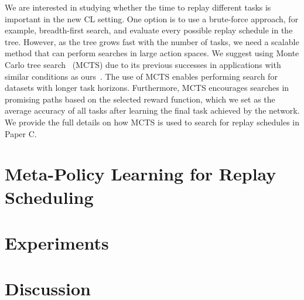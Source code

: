 We are interested in studying whether the time to replay different tasks is important in the new CL setting. One option is to use a brute-force approach, for example, breadth-first search, and evaluate every possible replay schedule in the tree. However, as the tree grows fast with the number of tasks, we need a scalable method that can perform searches in large action spaces. We suggest using Monte Carlo tree search~\cite{coulom2006efficient} (MCTS) due to its previous successes in applications with similar conditions as ours~\cite{browne2012survey, silver2016mastering, chaudhry2018feature}. The use of MCTS enables performing search for datasets with longer task horizons. Furthermore, MCTS encourages searches in promising paths based on the selected reward function, which we set as the average accuracy of all tasks after learning the final task achieved by the network. We provide the full details on how MCTS is used to search for replay schedules in Paper C. 




\section{Meta-Policy Learning for Replay Scheduling}




\section{Experiments}
\section{Discussion}



